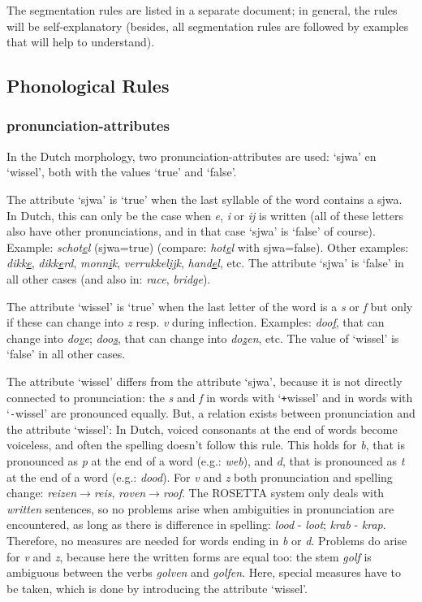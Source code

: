 The segmentation rules are listed in a separate document; in general, 
the rules will be self-explanatory (besides, all segmentation rules are followed
by examples that will help to understand).


\subsection{Phonological Rules}

\subsubsection{pronunciation-attributes}

In the Dutch morphology, two pronunciation-attributes are used:
`sjwa' en `wissel', both with the values `true' and `false'.

The attribute `sjwa' is `true' when the last syllable of the word contains
a sjwa. In Dutch, this can only be the case when {\em e}, {\em i} or {\em ij}
is written (all of these letters also have other pronunciations, and in that 
case `sjwa' is `false' of course). Example: {\em schot\underline{e}l}
(sjwa=true) 
(compare: {\em hot\underline{e}l} with sjwa=false). Other examples: 
{\em dikk\underline{e}}, {\em dikk\underline{e}rd}, {\em monn\underline{i}k}, 
{\em verrukkel\underline{ij}k}, {\em hand\underline{e}l}, etc. 
The attribute `sjwa' 
is `false' in all other cases (and also in: {\em race}, {\em bridge}).

The attribute `wissel' is `true' when the last letter of the word is a {\em s}
or {\em f} but only if these can change into {\em z} resp. {\em v}
during inflection. 
Examples: {\em doo\underline{f}}, that can change into {\em do\underline{v}e};
{\em doo\underline{s}}, that can change into {\em do\underline{z}en}, etc. 
The value of `wissel' is `false' in 
all other cases.

The attribute `wissel' differs from the attribute `sjwa', because it is not
directly connected to pronunciation: the {\em s} and {\em f} 
in words with `{\tt +}wissel' and in words 
with `{\tt -}wissel' are pronounced equally. But, a relation exists between
pronunciation and the attribute `wissel':
In Dutch, voiced consonants at the end of words become voiceless, and 
often the spelling doesn't follow this rule. This holds for {\em b},
that is pronounced as {\em p} at the end of a word (e.g.: {\em web}), 
and {\em d}, that is pronounced as {\em t} at the end of a word 
(e.g.: {\em dood}). For {\em v} and {\em z} both pronunciation 
and spelling change: {\em reizen}$\longrightarrow${\em reis}, 
{\em roven}$\longrightarrow${\em roof}.
The ROSETTA system only deals with {\em written} sentences, so no
problems arise when ambiguities in pronunciation are encountered, as long as 
there is difference in spelling: {\em lood} - {\em loot};
{\em krab} - {\em krap}. Therefore, no 
measures are needed for words ending in {\em b} or {\em d}.
Problems do arise for {\em v} and {\em z}, because 
here the written forms are equal 
too: the stem {\em golf} is ambiguous between the verbs {\em golven} 
and {\em golfen}. Here,
special measures have to be taken, which is done by introducing the 
attribute `wissel'.


